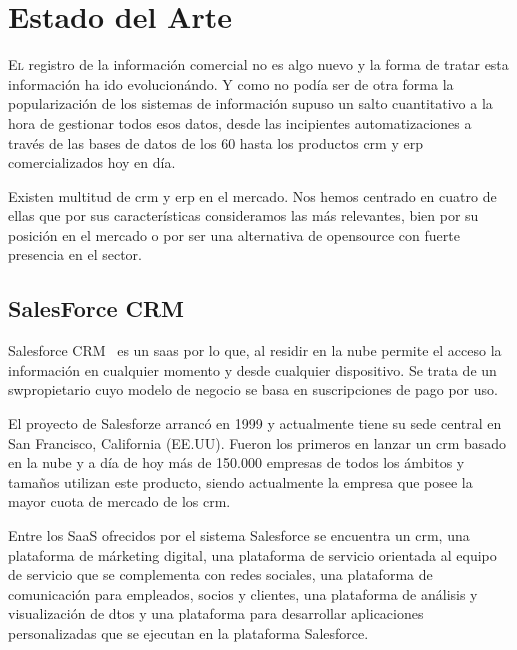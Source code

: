  \chapter{Estado del Arte}
\label{chap:estado-arte}

\lettrine{E}{l} registro de la información comercial no es algo nuevo y la forma de tratar esta información ha ido evolucionándo. Y como no podía ser de otra forma la popularización de los sistemas de información supuso un salto cuantitativo a la hora de gestionar todos esos datos, desde las incipientes automatizaciones a través de las bases de datos de los 60 hasta los productos \acrshort{crm} y \acrshort{erp} comercializados hoy en día.

Existen multitud de \acrshort{crm} y \acrshort{erp} en el mercado. Nos hemos centrado en cuatro de ellas que por sus características consideramos las más relevantes, bien por su posición en el mercado o por ser una alternativa de \gls{opensource} con fuerte presencia en el sector.



\section{SalesForce CRM}
\label{sec:estado-arte-salesforce}

Salesforce CRM~\cite{SalesforceCRM} es un \acrfull{saas} por lo que, al residir en la nube permite el acceso la información en cualquier momento y desde cualquier dispositivo. Se trata de un \gls{swpropietario} cuyo modelo de negocio se basa en suscripciones de pago por uso.

El proyecto de Salesforze arrancó en 1999 y actualmente tiene su sede central en San Francisco, California (EE.UU). Fueron los primeros en lanzar un \acrshort{crm} basado en la nube y a día de hoy más de 150.000 empresas de todos los ámbitos y tamaños utilizan este producto, siendo actualmente la empresa que posee la mayor cuota de mercado de los \acrshort{crm}. \newline

Entre los SaaS ofrecidos por el sistema Salesforce se encuentra un \acrshort{crm}, una plataforma de márketing digital, una plataforma de servicio orientada al equipo de servicio que se complementa con redes sociales, una plataforma de comunicación para empleados, socios y clientes, una plataforma de análisis y visualización de dtos y una plataforma para desarrollar aplicaciones personalizadas que se ejecutan en la plataforma Salesforce.

